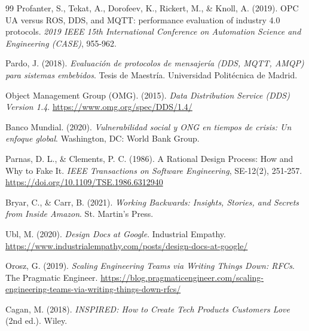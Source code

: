 \begin{thebibliography}{99}
Profanter, S., Tekat, A., Dorofeev, K., Rickert, M., \& Knoll, A. (2019). OPC UA versus ROS, DDS, and MQTT: performance evaluation of industry 4.0 protocols. \textit{2019 IEEE 15th International Conference on Automation Science and Engineering (CASE)}, 955-962.

Pardo, J. (2018). \textit{Evaluaci\'on de protocolos de mensajer\'ia (DDS, MQTT, AMQP) para sistemas embebidos}. Tesis de Maestr\'ia. Universidad Polit\'ecnica de Madrid.

Object Management Group (OMG). (2015). \textit{Data Distribution Service (DDS) Version 1.4}. \url{https://www.omg.org/spec/DDS/1.4/}

Banco Mundial. (2020). \textit{Vulnerabilidad social y ONG en tiempos de crisis: Un enfoque global}. Washington, DC: World Bank Group.

Parnas, D. L., \& Clements, P. C. (1986). A Rational Design Process: How and Why to Fake It. \textit{IEEE Transactions on Software Engineering}, SE-12(2), 251-257. \url{https://doi.org/10.1109/TSE.1986.6312940}

Bryar, C., \& Carr, B. (2021). \textit{Working Backwards: Insights, Stories, and Secrets from Inside Amazon}. St. Martin's Press.

Ubl, M. (2020). \textit{Design Docs at Google}. Industrial Empathy. \url{https://www.industrialempathy.com/posts/design-docs-at-google/}

Orosz, G. (2019). \textit{Scaling Engineering Teams via Writing Things Down: RFCs}. The Pragmatic Engineer. \url{https://blog.pragmaticengineer.com/scaling-engineering-teams-via-writing-things-down-rfcs/}

Cagan, M. (2018). \textit{INSPIRED: How to Create Tech Products Customers Love} (2nd ed.). Wiley.

\end{thebibliography}
